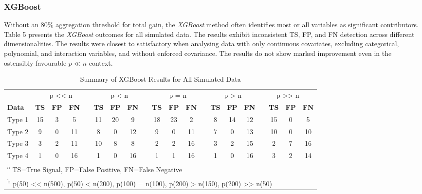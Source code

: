 \documentclass[
  11pt,
]{article}
\begin{document}
\subsubsection{XGBoost}

Without an 80\% aggregation threshold for total gain, the \emph{XGBoost}
method often identifies most or all variables as significant
contributors. Table 5 presents the \emph{XGBoost} outcomes for all
simulated data. The results exhibit inconsistent TS, FP, and FN
detection across different dimensionalities. The results were closest to
satisfactory when analysing data with only continuous covariates,
excluding categorical, polynomial, and interaction variables, and
without enforced covariance. The results do not show marked improvement
even in the ostensibly favourable \(p \ll n\) context.

\begin{landscape}

\begin{table}[H]

\caption{\label{tab:Results XGBoost}Summary of XGBoost Results for All Simulated Data}
\centering
\fontsize{10}{12}\selectfont
\begin{tabular}[t]{>{}l|>{}c|>{}c|>{}c|>{}c|>{}c|>{}c|>{}c|>{}c|>{}c|>{}c|>{}c|>{}c|>{}c|>{}c|>{}c|>{}c|>{}c|>{}c|>{}c|}
\toprule
\multicolumn{1}{c}{ } & \multicolumn{4}{c}{p << n} & \multicolumn{4}{c}{p < n} & \multicolumn{4}{c}{p = n} & \multicolumn{3}{c}{p > n} & \multicolumn{4}{c}{p >> n} \\
\cmidrule(l{3pt}r{3pt}){2-5} \cmidrule(l{3pt}r{3pt}){6-9} \cmidrule(l{3pt}r{3pt}){10-13} \cmidrule(l{3pt}r{3pt}){14-16} \cmidrule(l{3pt}r{3pt}){17-20}
\textbf{Data} & \textbf{TS} & \textbf{FP} & \textbf{FN} &  & \textbf{TS} & \textbf{FP} & \textbf{FN} &  & \textbf{TS} & \textbf{FP} & \textbf{FN} &  & \textbf{TS} & \textbf{FP} & \textbf{FN} &  & \textbf{TS} & \textbf{FP} & \textbf{FN}\\
\addlinespace
\midrule
Type 1 & 15 & 3 & 5 &  & 11 & 20 & 9 &  & 18 & 23 & 2 &  & 8 & 14 & 12 &  & 15 & 0 & 5\\
Type 2 & 9 & 0 & 11 &  & 8 & 0 & 12 &  & 9 & 0 & 11 &  & 7 & 0 & 13 &  & 10 & 0 & 10\\
Type 3 & 3 & 2 & 11 &  & 10 & 8 & 8 &  & 2 & 2 & 16 &  & 3 & 2 & 15 &  & 2 & 7 & 16\\
Type 4 & 1 & 0 & 16 &  & 1 & 0 & 16 &  & 1 & 1 & 16 &  & 1 & 0 & 16 &  & 3 & 2 & 14\\
\bottomrule
\multicolumn{20}{l}{\textsuperscript{a} TS=True Signal, FP=False Positive, FN=False Negative}\\
\multicolumn{20}{l}{\textsuperscript{b} p(50) << n(500), p(50) < n(200), p(100) = n(100), p(200) > n(150), p(200) >> n(50)}\\
\end{tabular}
\end{table}

\end{landscape}
\end{document}
